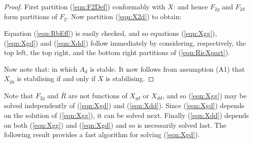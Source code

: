 \begin{proof}
First partition (\ref{eqn:F2Def}) conformably with $X$:
and hence $F_{2g}$ and $F_{2d}$ form partitions of $F_2$.
Now partition (\ref{eqn:X2d}) to obtain:

Equation (\ref{eqn:RbEff}) is easily checked, and so equations (\ref{eqn:Xgg}), (\ref{eqn:Xgd}) and (\ref{eqn:Xdd}) follow immediately by considering, respectively, the top left, the top right, and the bottom right partitions of (\ref{eqn:RicXpart}).

Now note that:
in which $A_d$ is stable.  It now follows from assumption (A1) that $X_{gg}$ is stabilising if and only if $X$ is stabilising.
\end{proof}
%

Note that $F_{2g}$ and $\bar R$ are not functions of $X_{gd}$ or $X_{dd}$, and so (\ref{eqn:Xgg}) may be solved independently of (\ref{eqn:Xgd}) and (\ref{eqn:Xdd}). Since (\ref{eqn:Xgd}) depends on the solution of (\ref{eqn:Xgg}), it can be solved next. Finally (\ref{eqn:Xdd}) depends on both (\ref{eqn:Xgg}) and (\ref{eqn:Xgd}) and so is necessarily solved last. The following result provides a fast algorithm for solving (\ref{eqn:Xgd}).

